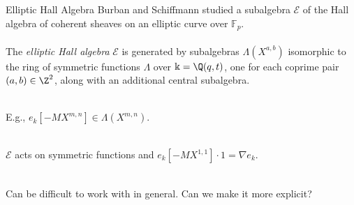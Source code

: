\documentclass[dvipsnames,handout]{beamer}
\newcommand{\Ecal}{\mathcal{E}}
\newcommand{\kk}{\Bbbk}
\theoremstyle{definition}
\newcounter{c}
\begin{document}
\begin{frame}{Elliptic Hall Algebra}
  Burban and Schiffmann studied a subalgebra  $\mathcal{E}$
of the Hall algebra of coherent sheaves on an elliptic curve over
$\mathbb{F}_p$. \\

\ \\

The \emph{elliptic Hall algebra} $\Ecal$ is generated by subalgebras $\Lambda(X^{a,b})$
isomorphic to the ring of symmetric functions  $\Lambda$ over $\kk = \Q(q,t)$,
one for each coprime pair $(a,b) \in \Z^2$, along with an additional
central subalgebra. \pause

\ \\
E.g., \(e_k[-MX^{m,n}] \in \Lambda(X^{m,n})\). 

\ \\

\(\Ecal\) acts on symmetric functions and \(e_k[-MX^{1,1}] \cdot 1 =
\nabla e_k\). \pause

\ \\

Can be difficult to work with in general. Can we make it more explicit?

\end{frame}
\end{document}
